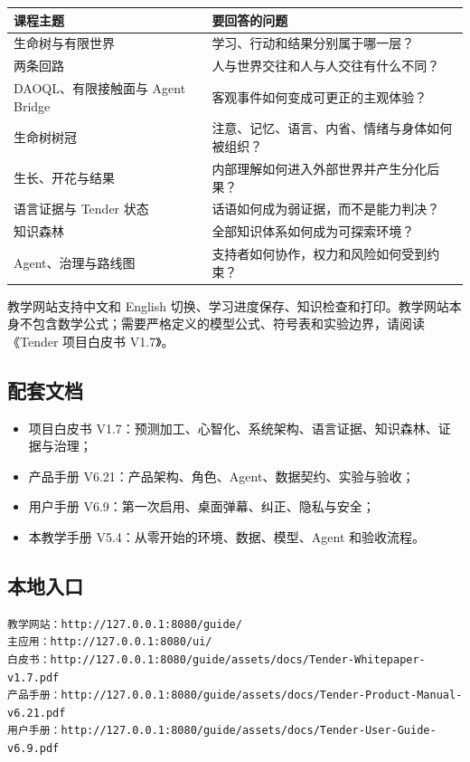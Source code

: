 \documentclass[UTF8,a4paper,11pt]{ctexart}
\begin{document}
\begin{center}
\begin{longtable}{@{}p{3.6cm}p{8.0cm}@{}}
\toprule
\textbf{课程主题} & \textbf{要回答的问题} \\
\midrule
生命树与有限世界 & 学习、行动和结果分别属于哪一层？ \\
两条回路 & 人与世界交往和人与人交往有什么不同？ \\
DAOQL、有限接触面与 Agent Bridge & 客观事件如何变成可更正的主观体验？ \\
生命树树冠 & 注意、记忆、语言、内省、情绪与身体如何被组织？ \\
生长、开花与结果 & 内部理解如何进入外部世界并产生分化后果？ \\
语言证据与 Tender 状态 & 话语如何成为弱证据，而不是能力判决？ \\
知识森林 & 全部知识体系如何成为可探索环境？ \\
Agent、治理与路线图 & 支持者如何协作，权力和风险如何受到约束？ \\
\bottomrule
\end{longtable}
\end{center}

教学网站支持中文和 English 切换、学习进度保存、知识检查和打印。教学网站本身不包含数学公式；需要严格定义的模型公式、符号表和实验边界，请阅读《Tender 项目白皮书 V1.7》。

\subsection{配套文档}

\begin{itemize}
\item 项目白皮书 V1.7：预测加工、心智化、系统架构、语言证据、知识森林、证据与治理；
\item 产品手册 V6.21：产品架构、角色、Agent、数据契约、实验与验收；
\item 用户手册 V6.9：第一次启用、桌面弹幕、纠正、隐私与安全；
\item 本教学手册 V5.4：从零开始的环境、数据、模型、Agent 和验收流程。
\end{itemize}

\subsection{本地入口}

\begin{verbatim}
教学网站：http://127.0.0.1:8080/guide/
主应用：http://127.0.0.1:8080/ui/
白皮书：http://127.0.0.1:8080/guide/assets/docs/Tender-Whitepaper-v1.7.pdf
产品手册：http://127.0.0.1:8080/guide/assets/docs/Tender-Product-Manual-v6.21.pdf
用户手册：http://127.0.0.1:8080/guide/assets/docs/Tender-User-Guide-v6.9.pdf
\end{verbatim}
\end{document}
